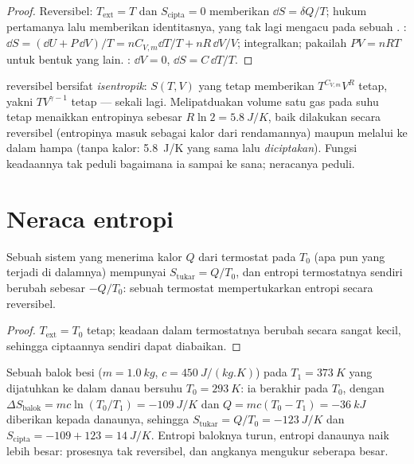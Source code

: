 \begin{proof}
Reversibel: $T_{\mathrm{ext}} = T$ dan $S_{\mathrm{cipta}} = 0$ memberikan $\dd S =
\delta Q/T$; hukum pertamanya lalu memberikan identitasnya, yang tak lagi
mengacu pada sebuah . : $\dd S = (\dd U + P\,\dd V)/T = nC_{V,m}\dd T/T
+ nR\,\dd V/V$; integralkan; pakailah $PV = nRT$ untuk bentuk yang lain. : $\dd V = 0$, $\dd S = C\,\dd T/T$.
\end{proof}

\begin{example}\label{ex:b1:second-law-entropy:formulas}
 reversibel bersifat \emph{isentropik}: $S(T, V)$
yang tetap memberikan $T^{C_{V,m}}V^R$ tetap, yakni $TV^{\gamma - 1}$ tetap ---
 sekali lagi. Melipatduakan volume satu  gas pada suhu
tetap menaikkan entropinya sebesar $R\ln2 = \qty{5.8}{J/K}$, baik dilakukan
secara reversibel (entropinya masuk sebagai kalor dari rendamannya) maupun melalui  ke dalam hampa (tanpa kalor: \qty{5.8}{J/K} yang sama lalu
\emph{diciptakan}). Fungsi keadaannya tak peduli bagaimana ia sampai ke sana;
neracanya peduli.
\end{example}

\section{Neraca entropi}

\begin{proposition}\label{prop:b1:second-law-entropy:thermostat}
Sebuah sistem yang menerima kalor $Q$ dari termostat pada $T_0$ (apa pun yang
terjadi di dalamnya) mempunyai $S_{\mathrm{tukar}} = Q/T_0$, dan entropi termostatnya
sendiri berubah sebesar $-Q/T_0$: sebuah termostat mempertukarkan entropi secara reversibel.
\end{proposition}

\begin{proof}
$T_{\mathrm{ext}} = T_0$ tetap; keadaan dalam termostatnya
berubah secara sangat kecil, sehingga ciptaannya sendiri dapat diabaikan.
\end{proof}

\begin{example}\label{ex:b1:second-law-entropy:quench}
Sebuah balok besi ($m = \qty{1.0}{kg}$, $c = \qty{450}{J/(kg.K)}$) pada $T_1 =
\qty{373}{K}$ yang dijatuhkan ke dalam danau bersuhu $T_0 = \qty{293}{K}$: ia berakhir pada $T_0$,
dengan $\Delta S_{\text{balok}} = mc\ln(T_0/T_1) = \qty{-109}{J/K}$ dan $Q =
mc(T_0 - T_1) = \qty{-36}{kJ}$ diberikan kepada danaunya, sehingga $S_{\mathrm{tukar}} =
Q/T_0 = \qty{-123}{J/K}$ dan $S_{\mathrm{cipta}} = -109 + 123 = \qty{+14}{J/K}$.
Entropi baloknya turun, entropi danaunya naik lebih besar: prosesnya
tak reversibel, dan angkanya mengukur seberapa besar.
\end{example}

